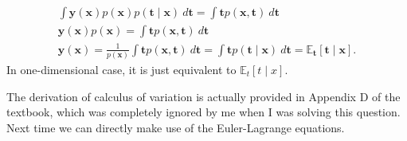\begin{answer}{}
\begin{gather}
		\int \bm{y}(\bm{x}) p(\bm{x}) p(\bm{t} \mid \bm{x})\ d\bm{t} = \int \bm{t} p(\bm{x}, \bm{t})\ d\bm{t}\\
		\bm{y}(\bm{x})p(\bm{x}) = \int \bm{t} p(\bm{x}, \bm{t})\ d\bm{t}\\
		\bm{y}(\bm{x}) = \frac{1}{p(\bm{x})}\int \bm{t} p(\bm{x}, \bm{t})\ d\bm{t} = \int \bm{t} p(\bm{t} \mid \bm{x})\ d\bm{t} = \mathbb{E}_{\bm{t}}\left[\bm{t} \mid \bm{x}\right].
	\end{gather}
	In one-dimensional case, it is just equivalent to $\mathbb{E}_{t}\left[t \mid x\right]$.
\end{answer}

\begin{afternote}
	The derivation of calculus of variation is actually provided in Appendix D of the textbook, which was completely ignored by me when I was solving this question. Next time we can directly make use of the Euler-Lagrange equations.
\end{afternote}
